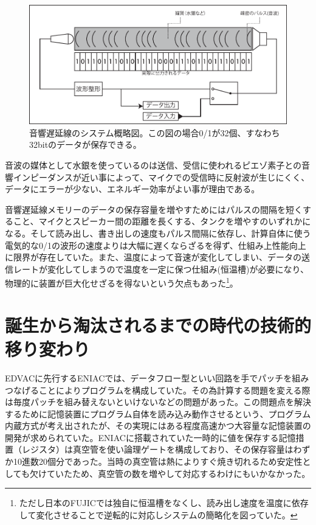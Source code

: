 \documentclass[a4paper,report]{jsbook}
\begin{document}
\begin{figure}[htbp]
\centering
\includegraphics[width=1.00000\textwidth]{./img/adm_setsumei.pdf}
\caption{音響遅延線のシステム概略図。この図の場合0/1が32個、すなわち32bitのデータが保存できる。\label{fig:adm}}
\end{figure}

音波の媒体として水銀を使っているのは送信、受信に使われるピエゾ素子との音響インピーダンスが近い事によって、マイクでの受信時に反射波が生じにくく、データにエラーが少ない、エネルギー効率がよい事が理由である。

音響遅延線メモリーのデータの保存容量を増やすためにはパルスの間隔を短くすること、マイクとスピーカー間の距離を長くする、タンクを増やすのいずれかになる。そして読み出し、書き出しの速度もパルス間隔に依存し、計算自体に使う電気的な0/1の波形の速度よりは大幅に遅くならざるを得ず、仕組み上性能向上に限界が存在していた。また、温度によって音速が変化してしまい、データの送信レートが変化してしまうので温度を一定に保つ仕組み(恒温槽)が必要になり、物理的に装置が巨大化せざるを得ないという欠点もあった\footnote{ただし日本のFUJICでは独自に恒温槽をなくし、読み出し速度を温度に依存して変化させることで逆転的に対応しシステムの簡略化を図っていた。}。

\section{誕生から淘汰されるまでの時代の技術的移り変わり}\label{ux8a95ux751fux304bux3089ux6dd8ux6c70ux3055ux308cux308bux307eux3067ux306eux6642ux4ee3ux306eux6280ux8853ux7684ux79fbux308aux5909ux308fux308a}

EDVACに先行するENIACでは、データフロー型といい回路を手でパッチを組みつなげることによりプログラムを構成していた。その為計算する問題を変える際は毎度パッチを組み替えないといけないなどの問題があった。この問題点を解決するために記憶装置にプログラム自体を読み込み動作させるという、プログラム内蔵方式が考え出されたが、その実現にはある程度高速かつ大容量な記憶装置の開発が求められていた。ENIACに搭載されていた一時的に値を保存する記憶措置（レジスタ）は真空管を使い論理ゲートを構成しており、その保存容量はわずか10進数20個分であった。当時の真空管は熱によりすぐ焼き切れるため安定性としても欠けていたため、真空管の数を増やして対応するわけにもいかなかった。
\end{document}
